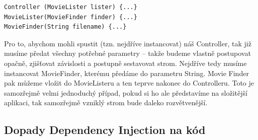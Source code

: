 \documentclass[a4paper,conference]{IEEEtran}
\begin{document}
\lstset{language=Java,caption=Konstruktory tříd k příkladu,label=listing:Java}
\begin{lstlisting}
Controller (MovieLister lister) {...}
MovieLister(MovieFinder finder) {...}
MovieFinder(String filename) {...}
\end{lstlisting}

Pro to, abychom mohli spustit (tzn. nejdříve instancovat) náš Controller, tak již musíme předat všechny potřebné parametry – takže budeme vlastně postupovat opačně, zjišťovat závislosti a postupně sestavovat strom. Nejdříve tedy musíme instancovat MovieFinder, kterému předáme do parametru String. Movie Finder pak můžeme vložit do MovieListeru a ten teprve nakonec do Controlleru. Toto je samozřejmě velmi jednoduchý případ, pokud si ho ale představíme na složitější aplikaci, tak samozřejmě vzniklý strom bude daleko rozvětvenější.

\subsection{Dopady Dependency Injection na kód}
\end{document}
